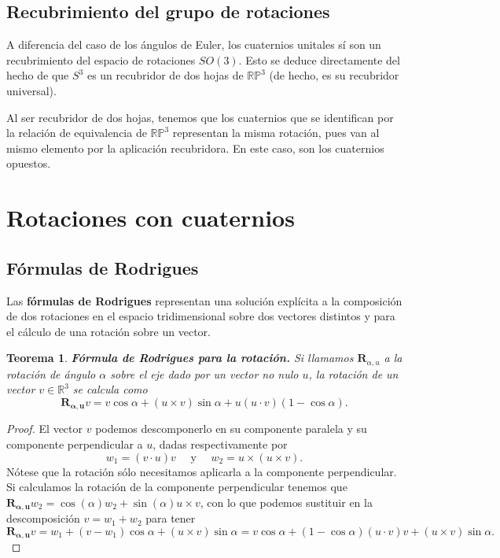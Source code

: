 \documentclass{article}
\theoremstyle{plain}
\newtheorem{theorem}{Teorema}
\theoremstyle{definition}
\theoremstyle{remark}
\begin{document}

\subsection{Recubrimiento del grupo de rotaciones}

A diferencia del caso de los ángulos de Euler, los cuaternios unitales
sí son un recubrimiento del espacio de rotaciones $SO(3)$. Esto se
deduce directamente del hecho de que $S^3$ es un recubridor de dos
hojas de $\mathbb{RP}^3$ (de hecho, es su recubridor universal).

Al ser recubridor de dos hojas, tenemos que los cuaternios que se
identifican por la relación de equivalencia de $\mathbb{RP}^3$
representan la misma rotación, pues van al mismo elemento por la
aplicación recubridora. En este caso, son los cuaternios opuestos.


\section{Rotaciones con cuaternios}
\subsection{Fórmulas de Rodrigues}
Las \textbf{fórmulas de Rodrigues} representan una solución explícita
a la composición de dos rotaciones en el espacio tridimensional sobre
dos vectores distintos y para el cálculo de una rotación sobre un
vector.

\begin{theorem}
  \textbf{Fórmula de Rodrigues para la rotación.} Si llamamos
  $\mathbf{R}_{\alpha,u}$ a la rotación de ángulo $\alpha$ sobre el
  eje dado por un vector no nulo $u$, la rotación de un vector
  $v \in\mathbb{R}^3$ se calcula como
  \[\mathbf{R_{\alpha,u}}v = v \cos \alpha + (u \times v)\sin \alpha + u(u\cdot v)(1-\cos\alpha).\]
\end{theorem}
\begin{proof}
  El vector $v$ podemos descomponerlo en su componente paralela y su
  componente perpendicular a $u$, dadas respectivamente por
  \[w_1 = (v \cdot u) v \quad \text{ y } \quad w_2 = u \times (u \times v).\]
  Nótese que la rotación sólo necesitamos aplicarla a
  la componente perpendicular. Si calculamos la rotación de la
  componente perpendicular tenemos que
  $\mathbf{R_{\alpha,u}} w_2 = \cos(\alpha) w_2 + \sin(\alpha) u \times v$, con
  lo que podemos sustituir en la descomposición $v = w_1+w_2$ para
  tener
  \[\mathbf{R_{\alpha,u}}v =
    w_1 + (v-w_1)\cos\alpha + (u \times v)\sin\alpha =
    v\cos\alpha + (1-\cos \alpha)(u \cdot v)v + (u \times v)\sin\alpha.
  \]
\end{proof}
\end{document}
